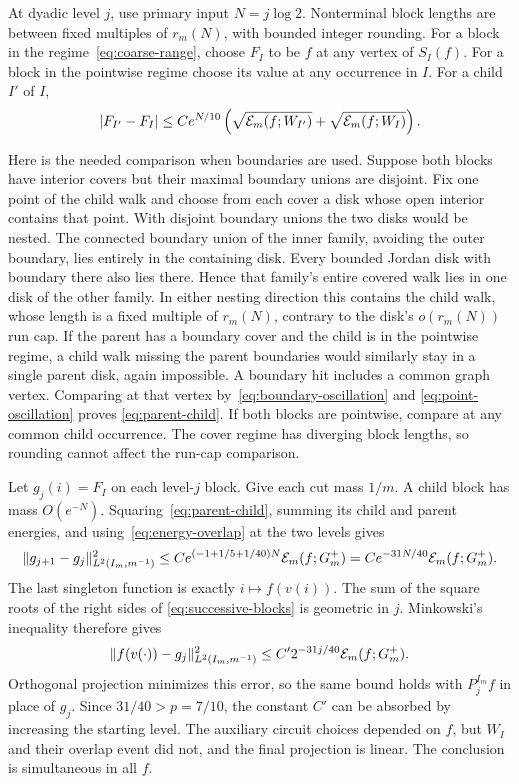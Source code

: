 At dyadic level \(j\), use primary input \(N=j\log2\).
Nonterminal block lengths are between fixed multiples of
\(r_m(N)\), with bounded integer rounding.  For a block in
the regime~\eqref{eq:coarse-range}, choose \(F_I\) to be
\(f\) at any vertex of \(S_I(f)\).  For a block in the
pointwise regime choose its value at any occurrence in \(I\).
For a child \(I'\) of \(I\),
\begin{equation}
\label{eq:parent-child}
 \lvert F_{I'}-F_I\rvert
 \le C e^{N/10}
 \left(\sqrt{\mathcal E_m(f;W_{I'})}
       +\sqrt{\mathcal E_m(f;W_I)}\right).
\end{equation}

Here is the needed comparison when boundaries are used.
Suppose both blocks have interior covers but their maximal boundary
unions are disjoint.  Fix one point of the child walk and choose
from each cover a disk whose open interior contains that point.
With disjoint boundary unions
the two disks would be nested.  The connected boundary union
of the inner family, avoiding the outer boundary, lies
entirely in the containing disk.  Every bounded Jordan disk
with boundary there also lies there.  Hence that family's
entire covered walk lies in one disk of the other family.
In either nesting direction this contains the child walk,
whose length is a fixed multiple of \(r_m(N)\), contrary
to the disk's \(o(r_m(N))\) run cap.  If the parent has a
boundary cover and the child is in the pointwise regime, a
child walk missing the parent boundaries would similarly
stay in a single parent disk, again impossible.  A boundary
hit includes a common graph vertex.  Comparing at that
vertex by~\eqref{eq:boundary-oscillation} and
\eqref{eq:point-oscillation} proves
\eqref{eq:parent-child}.  If both blocks are pointwise,
compare at any common child occurrence.  The cover regime
has diverging block lengths, so rounding cannot affect the
run-cap comparison.

Let \(g_j(i)=F_I\) on each level-\(j\) block.  Give each cut
mass \(1/m\).  A child block has mass \(O(e^{-N})\).
Squaring~\eqref{eq:parent-child}, summing its child and parent
energies, and using~\eqref{eq:energy-overlap} at the two
levels gives
\begin{equation}
\label{eq:successive-blocks}
 \lVert g_{j+1}-g_j\rVert_{L^2(I_m,m^{-1})}^2
 \le C e^{(-1+1/5+1/40)N}\mathcal E_m(f;G_m^+)
 =C e^{-31N/40}\mathcal E_m(f;G_m^+).
\end{equation}
The last singleton function is exactly \(i\mapsto f(v(i))\).
The sum of the square roots of the right sides of
\eqref{eq:successive-blocks} is geometric in \(j\).
Minkowski's inequality therefore gives
\[
 \lVert f(v(\cdot))-g_j\rVert_{L^2(I_m,m^{-1})}^2
 \le C'2^{-31j/40}\mathcal E_m(f;G_m^+).
\]
Orthogonal projection minimizes this error, so the same
bound holds with \(P_j^{I_m}f\) in place of \(g_j\).
Since \(31/40>p=7/10\), the constant \(C'\) can be absorbed
by increasing the starting level.  The auxiliary circuit
choices depended on \(f\), but \(W_I\) and their overlap
event did not, and the final projection is linear.  The
conclusion is simultaneous in all \(f\).


